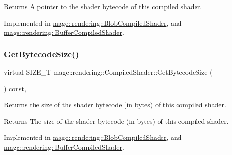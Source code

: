 \begin{DoxyReturn}{Returns}
A pointer to the shader bytecode of this compiled shader. 
\end{DoxyReturn}


Implemented in \hyperlink{classmage_1_1rendering_1_1_blob_compiled_shader_a4d7f3d2d9864cb12939386ff031bd783}{mage\+::rendering\+::\+Blob\+Compiled\+Shader}, and \hyperlink{classmage_1_1rendering_1_1_buffer_compiled_shader_a0887622bd25db8698c572d0dc46167b9}{mage\+::rendering\+::\+Buffer\+Compiled\+Shader}.

\hypertarget{classmage_1_1rendering_1_1_compiled_shader_a92c17b46242bf884c3d0d673e88a292d}{}\label{classmage_1_1rendering_1_1_compiled_shader_a92c17b46242bf884c3d0d673e88a292d} 
\subsubsection{\texorpdfstring{Get\+Bytecode\+Size()}{GetBytecodeSize()}}
{\footnotesize\ttfamily virtual S\+I\+Z\+E\+\_\+T mage\+::rendering\+::\+Compiled\+Shader\+::\+Get\+Bytecode\+Size (\begin{DoxyParamCaption}{ }\end{DoxyParamCaption}) const\hspace{0.3cm}{\ttfamily [pure virtual]}, {\ttfamily [noexcept]}}

Returns the size of the shader bytecode (in bytes) of this compiled shader.

\begin{DoxyReturn}{Returns}
The size of the shader bytecode (in bytes) of this compiled shader. 
\end{DoxyReturn}


Implemented in \hyperlink{classmage_1_1rendering_1_1_blob_compiled_shader_ac3c3edb09ba96367f8c5d6741ec03041}{mage\+::rendering\+::\+Blob\+Compiled\+Shader}, and \hyperlink{classmage_1_1rendering_1_1_buffer_compiled_shader_a235948a6ba0bcac698d6e35ce3504da2}{mage\+::rendering\+::\+Buffer\+Compiled\+Shader}.

\hypertarget{classmage_1_1rendering_1_1_compiled_shader_a1981d885693b7849078f509f15b81071}{}\label{classmage_1_1rendering_1_1_compiled_shader_a1981d885693b7849078f509f15b81071} 
